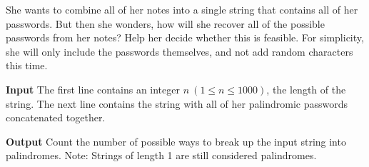 \normalfont\documentclass[letterpaper,11pt]{article}
\begin{document}
She wants to combine all of her notes into a single string that contains all of her passwords. But then she wonders, how will she recover all of the possible passwords from her notes? Help her decide whether this is feasible. For simplicity, she will only include the passwords themselves, and not add random characters this time.

\textbf{Input} \newline
The first line contains an integer $n \ (1 \leq n \leq 1000)$, the length of the string. The next line contains the string with all of her palindromic passwords concatenated together.

\textbf{Output} \newline
Count the number of possible ways to break up the input string into palindromes. Note: Strings of length 1 are still considered palindromes.
\end{document}

